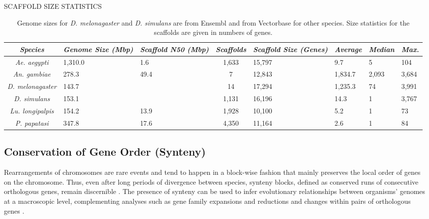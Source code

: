 \begin{table}[H]
  \centering
  \caption{SCAFFOLD SIZE STATISTICS}
  \begin{tabular}{c p{1.25cm} p{1.25cm} c p{1.25cm} p{1.25cm} p{1.25cm} p{1.25cm}} \hline
    \emph{Species} & \emph{Genome Size (Mbp)} & \emph{Scaffold N50 (Mbp)} & \emph{Scaffolds} & \emph{Scaffold Size (Genes)} & \emph{Average} & \emph{Median} & \emph{Max.} \\ \hline
    \emph{Ae. aegypti} & 1,310.0 & 1.6 & 1,633 & 15,797 & 9.7 & 5 & 104 \\
    \emph{An. gambiae} & 278.3 & 49.4 & 7 & 12,843 & 1,834.7 & 2,093 & 3,684 \\
    \emph{D. melonagaster} & 143.7 & & 14 & 17,294 & 1,235.3 & 74 & 3,991 \\ 
    \emph{D. simulans} & 153.1 & & 1,131 & 16,196 & 14.3 & 1 & 3,767 \\ 
    \emph{Lu. longipalpis} & 154.2 & 13.9 & 1,928 & 10,100 & 5.2 & 1 & 73\\
    \emph{P. papatasi} & 347.8 & 17.6 & 4,350 & 11,164 & 2.6 & 1 & 84
  \end{tabular}
  \caption*{Genome sizes for \emph{D. melonagaster} and \emph{D. simulans} are from Ensembl \cite{Hubbard2002} and from Vectorbase \cite{Lawson2009,Lawson2007} for other species. Size statistics for the scaffolds are given in numbers of genes.}
  \label{tab:scaffold-sizes}
\end{table}

\subsection{Conservation of Gene Order (Synteny)}
Rearrangements of chromosomes are rare events and tend to happen in a block-wise fashion that mainly preserves the local order of genes on the chromosome. Thus, even after long periods of divergence between species, synteny blocks, defined as conserved runs of consecutive orthologous genes, remain discernible \cite{Heger2007}.  The presence of synteny can be used to infer evolutionary relationships between organisms' genomes at a macroscopic level, complementing analyses such as gene family expansions and reductions and changes within pairs of orthologous genes \cite{Zdobnov2002,Zdobnov2007}.

